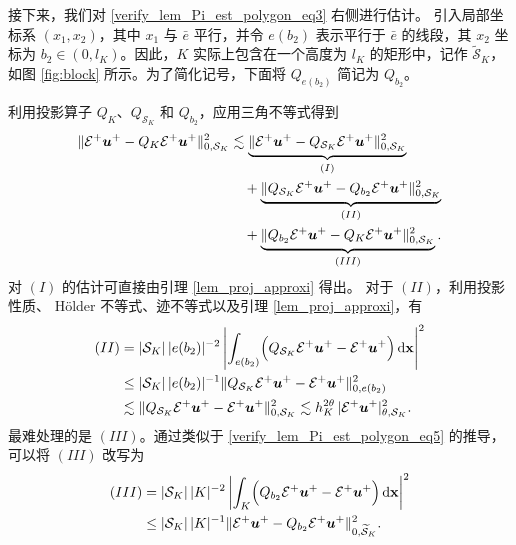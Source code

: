 接下来，我们对 \eqref{verify_lem_Pi_est_polygon_eq3} 右侧进行估计。
引入局部坐标系 $(x_1,x_2)$，其中 $x_1$ 与 $\bar{e}$ 平行，并令 $e(b_2)$ 表示平行于 $\bar{e}$ 的线段，其 $x_2$ 坐标为 $b_2\in (0,l_K)$。因此，$K$ 实际上包含在一个高度为 $l_K$ 的矩形中，记作 $\widetilde{\mathcal{S}}_K$，如图 \ref{fig:block} 所示。为了简化记号，下面将 $Q_{e(b_2)}$ 简记为 $Q_{b_2}$。

利用投影算子 $Q_{K}$、$Q_{\mathcal{S}_K}$ 和 $Q_{b_2}$，应用三角不等式得到
\begin{equation}
\begin{split}
\label{verify_lem_Pi_est_polygon_eq4}
\| \mathcal{E}^+ \boldsymbol{u}^+ - Q_{K} \mathcal{E}^+ \boldsymbol{u}^+ \|^2_{0,\mathcal{S}_K}
&\lesssim \underbrace{\| \mathcal{E}^+ \boldsymbol{u}^+ - Q_{\mathcal{S}_K} \mathcal{E}^+ \boldsymbol{u}^+ \|^2_{0,\mathcal{S}_K}}_{(I)} \\
&\quad + \underbrace{\| Q_{\mathcal{S}_K} \mathcal{E}^+ \boldsymbol{u}^+ - Q_{b_2} \mathcal{E}^+ \boldsymbol{u}^+ \|^2_{0,\mathcal{S}_K}}_{(II)} \\
&\quad + \underbrace{\| Q_{b_2} \mathcal{E}^+ \boldsymbol{u}^+ - Q_{K} \mathcal{E}^+ \boldsymbol{u}^+ \|^2_{0,\mathcal{S}_K}}_{(III)}.
\end{split}
\end{equation}
对 $(I)$ 的估计可直接由引理 \ref{lem_proj_approxi} 得出。
对于 $(II)$，利用投影性质、 Hölder 不等式、迹不等式以及引理 \ref{lem_proj_approxi}，有
\begin{equation}
\begin{split}
\label{verify_lem_Pi_est_polygon_eq5}
(II) &= |\mathcal{S}_K|\, |e(b_2)|^{-2} \left|\int_{e(b_2)} \Bigl(Q_{\mathcal{S}_K} \mathcal{E}^+ \boldsymbol{u}^+ - \mathcal{E}^+ \boldsymbol{u}^+\Bigr) \, \mathrm{ d} \mathbf{x} \right|^2 \\
&\le |\mathcal{S}_K|\, |e(b_2)|^{-1} \| Q_{\mathcal{S}_K} \mathcal{E}^+ \boldsymbol{u}^+ - \mathcal{E}^+ \boldsymbol{u}^+ \|^2_{0,e(b_2)} \\
&\lesssim \| Q_{\mathcal{S}_K} \mathcal{E}^+ \boldsymbol{u}^+ - \mathcal{E}^+ \boldsymbol{u}^+ \|^2_{0,\mathcal{S}_K}
\lesssim h^{2\theta}_K \, | \mathcal{E}^+ \boldsymbol{u}^+ |^2_{\theta,\mathcal{S}_K}.
\end{split}
\end{equation}
最难处理的是 $(III)$。通过类似于 \eqref{verify_lem_Pi_est_polygon_eq5} 的推导，可以将 $(III)$ 改写为
\begin{equation}
\begin{split}
\label{verify_lem_Pi_est_polygon_eq6}
(III) &= |\mathcal{S}_K|\, |K|^{-2} \left|\int_{K} \Bigl(Q_{b_2} \mathcal{E}^+ \boldsymbol{u}^+ - \mathcal{E}^+ \boldsymbol{u}^+\Bigr) \, \mathrm{ d} \mathbf{x} \right|^2\\
&\le |\mathcal{S}_K|\, |K|^{-1} \| \mathcal{E}^+ \boldsymbol{u}^+ - Q_{b_2} \mathcal{E}^+ \boldsymbol{u}^+ \|^2_{0,\widetilde{\mathcal{S}}_K}.
\end{split}
\end{equation}

